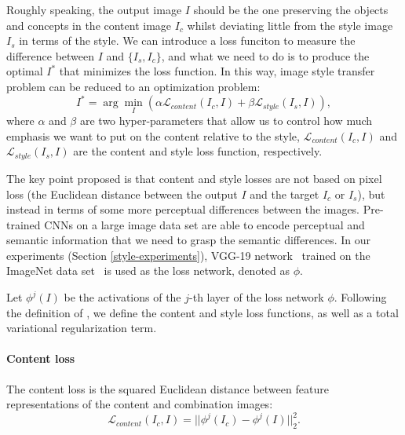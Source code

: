 \documentclass{article}
\begin{document}
Roughly speaking, the output image $I$ should be the one preserving the objects and concepts in the content image $I_c$ whilst deviating little from the style image $I_s$ in terms of the style. 
We can introduce a loss funciton to measure the difference between $I$ and $\{I_s,I_c\}$, 
and what we need to do is to produce the optimal $I^*$ that minimizes the loss function.
In this way, image style transfer problem can be reduced to an optimization problem:
\begin{equation}
I^* = \arg\min_{I}\left(\alpha\mathcal{L}_{content}(I_c,I)
+\beta\mathcal{L}_{style}(I_s,I)\right),
\end{equation}
where $\alpha$ and $\beta$ are two hyper-parameters that allow us to control how much emphasis we want to put on the content relative to the style, 
$\mathcal{L}_{content}(I_c,I)$ and $\mathcal{L}_{style}(I_s,I)$ are the content and style loss function, respectively.

The key point \citet{gatys2015neural} proposed is that content and style losses are not based on pixel loss (the Euclidean distance between the output $I$ and the target $I_c$ or $I_s$), but instead in terms of some more perceptual differences between the images. 
Pre-trained CNNs on a large image data set are able to encode perceptual and semantic information that we need to grasp the semantic differences. 
In our experiments (Section \ref{style-experiments}), VGG-19 network~\citep{simonyan2014very} trained on the ImageNet data set~\citep{russakovsky2015imagenet} is used as the loss network, denoted as $\phi$.

Let $\phi^j(I)$ be the activations of the $j$-th layer of the loss network $\phi$. Following the definition of \citet{gatys2015neural,johnson2016perceptual}, we define the content and style loss functions, as well as a total variational regularization term.

\paragraph{Content loss} The content loss is the squared Euclidean distance between feature representations of the content and combination images:
\begin{equation}
\mathcal{L}_{content}(I_c,I) = ||\phi^j(I_c) - \phi^j(I)||_2^2.
\end{equation}
\end{document}
